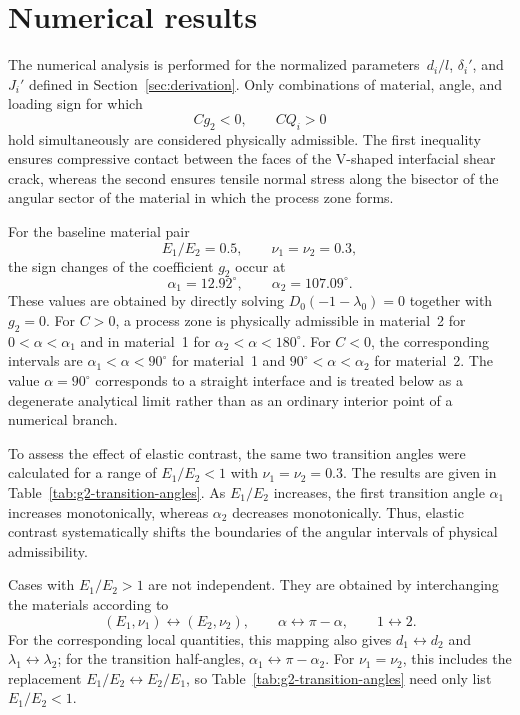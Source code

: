 \section{Numerical results}
\label{sec:numerical-results}

The numerical analysis is performed for the normalized parameters
$\,d_i/l$, $\delta_i'$, and $J_i'$ defined in
Section~\ref{sec:derivation}. Only combinations of material, angle, and
loading sign for which
\begin{equation*}
  Cg_2<0,\qquad CQ_i>0
\end{equation*}
hold simultaneously are considered physically admissible. The first
inequality ensures compressive contact between the faces of the V-shaped
interfacial shear crack, whereas the second ensures tensile normal stress
along the bisector of the angular sector of the material in which the
process zone forms.

For the baseline material pair
\begin{equation*}
  E_1/E_2=0.5,\qquad \nu_1=\nu_2=0.3,
\end{equation*}
the sign changes of the coefficient $g_2$ occur at
\begin{equation*}
  \alpha_1=12.92^\circ,\qquad
  \alpha_2=107.09^\circ.
\end{equation*}
These values are obtained by directly solving
$D_0(-1-\lambda_0)=0$ together with $g_2=0$. For $C>0$, a process zone
is physically admissible in material~2 for $0<\alpha<\alpha_1$ and in
material~1 for $\alpha_2<\alpha<180^\circ$. For $C<0$, the corresponding
intervals are $\alpha_1<\alpha<90^\circ$ for material~1 and
$90^\circ<\alpha<\alpha_2$ for material~2. The value
$\alpha=90^\circ$ corresponds to a straight interface and is treated
below as a degenerate analytical limit rather than as an ordinary
interior point of a numerical branch.

To assess the effect of elastic contrast, the same two transition angles
were calculated for a range of $E_1/E_2<1$ with
$\nu_1=\nu_2=0.3$. The results are given in
Table~\ref{tab:g2-transition-angles}. As $E_1/E_2$ increases, the first
transition angle $\alpha_1$ increases monotonically, whereas $\alpha_2$
decreases monotonically. Thus, elastic contrast systematically shifts
the boundaries of the angular intervals of physical admissibility.



Cases with $E_1/E_2>1$ are not independent. They are obtained by
interchanging the materials according to
\begin{equation*}
  (E_1,\nu_1)\leftrightarrow(E_2,\nu_2),
  \qquad
  \alpha\leftrightarrow\pi-\alpha,
  \qquad
  1\leftrightarrow2.
\end{equation*}
For the corresponding local quantities, this mapping also gives
$d_1\leftrightarrow d_2$ and
$\lambda_1\leftrightarrow\lambda_2$; for the transition half-angles,
$\alpha_1\leftrightarrow\pi-\alpha_2$. For $\nu_1=\nu_2$, this
includes the replacement
$E_1/E_2\leftrightarrow E_2/E_1$, so Table~\ref{tab:g2-transition-angles}
need only list $E_1/E_2<1$.

